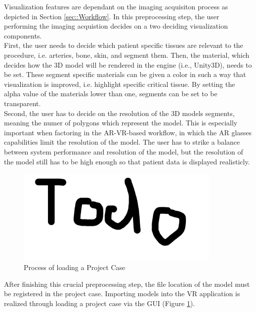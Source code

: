 Visualization features are dependant on the imaging acquisiton process as depicted in Section \ref{sec::Workflow}.
In this preprocessing step, the user performing the imaging acquistion decides on a two deciding visualization components.
\\ First, the user needs to decide which patient specific tissues are relevant to the procedure, i.e. arteries, bone, skin, and segment them.
Then, the material, which decides how the 3D model will be rendered in the engine (i.e., Unity3D), needs to be set.
These segment specific materials can be given a color in such a way that visualization is improved, i.e. highlight specific critical tissue.
By setting the alpha value of the materials lower than one, segments can be set to be transparent.
\\ Second, the user has to decide on the resolution of the 3D models segments, meaning the numer of polygons which represent the model.
This is especially important when factoring in the AR-VR-based workflow, in which the AR glasses capabilities limit the resolution of the model.
The user has to strike a balance between system performance and resolution of the model, but the resolution of the model still has to be high enough so that patient data is displayed realisticly.

\begin{figure}[ht]
  \centering
  \includegraphics[width=375px]{images/todo.png}
  \caption{\label{fig::LoadingProjectCase}Process of loading a Project Case}
\end{figure}

After finishing this crucial preprocessing step, the file location of the model must be registered in the project case.
Importing models into the VR application is realized through loading a project case via the GUI (Figure \ref{fig::LoadingProjectCase}).

